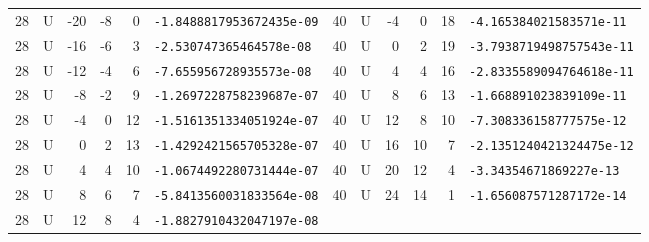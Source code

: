 \begin{longtable}{rcrrrl|rcrrrl}
28 & U & -20 & -8 & 0 & \texttt{-1.8488817953672435e-09} & 40 & U & -4 & 0 & 18 & \texttt{-4.165384021583571e-11}\\
28 & U & -16 & -6 & 3 & \texttt{-2.530747365464578e-08} & 40 & U & 0 & 2 & 19 & \texttt{-3.7938719498757543e-11}\\
28 & U & -12 & -4 & 6 & \texttt{-7.655956728935573e-08} & 40 & U & 4 & 4 & 16 & \texttt{-2.8335589094764618e-11}\\
28 & U & -8 & -2 & 9 & \texttt{-1.2697228758239687e-07} & 40 & U & 8 & 6 & 13 & \texttt{-1.668891023839109e-11}\\
28 & U & -4 & 0 & 12 & \texttt{-1.5161351334051924e-07} & 40 & U & 12 & 8 & 10 & \texttt{-7.308336158777575e-12}\\
28 & U & 0 & 2 & 13 & \texttt{-1.4292421565705328e-07} & 40 & U & 16 & 10 & 7 & \texttt{-2.1351240421324475e-12}\\
28 & U & 4 & 4 & 10 & \texttt{-1.0674492280731444e-07} & 40 & U & 20 & 12 & 4 & \texttt{-3.34354671869227e-13}\\
28 & U & 8 & 6 & 7 & \texttt{-5.8413560031833564e-08} & 40 & U & 24 & 14 & 1 & \texttt{-1.656087571287172e-14}\\
28 & U & 12 & 8 & 4 & \texttt{-1.8827910432047197e-08} &  & & & & & \\
\end{longtable}
